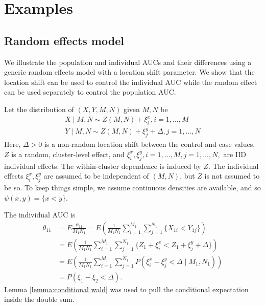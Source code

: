 \documentclass[12pt]{article}
\DeclareMathOperator{\AUC}{AUC}
\newcommand{\E}{E}
\renewcommand{\P}{P}
\newcommand{\cind}{\perp \!\!\! \perp}
\newcommand{\aucindiv}{\theta_{11}}%
\newcommand{\kernel}{\psi}
\newcommand{\Kernel}{\psi}
\begin{document}
\section{Examples}\label{section:examples} 

\subsection{Random effects model}\label{section:examples:random effects}
We illustrate the population and individual AUCs
and their differences using a generic random effects model with a
location shift parameter. We show that the location shift can be
used to control the individual AUC while the random effect can be used separately
to control the population AUC.

Let the distribution of $(X,Y,M,N)$ given $M,N$ be
\begin{align}
  X \mid M,N \sim Z(M,N) + \xi_i^x, i=1,\ldots,M\\
  Y \mid M,N \sim Z(M,N) + \xi_j^y + \Delta, j=1,\ldots,N
  \label{model:random effects}
\end{align}
Here, $\Delta>0$ is a non-random location shift between the control and
case values, $Z$ is a random, cluster-level effect, and
$\xi_i^x, \xi_j^y,i=1,\ldots,M,j=1,\ldots,N,$ are IID
individual effects. The within-cluster dependence is induced by
$Z$. The individual effects $\xi_i^x, \xi_j^y$ are assumed to be
independent of $(M,N)$, but $Z$ is not assumed to be so. To keep
things simple, we assume continuous densities are available, and so
$\kernel(x,y)=\{x<y\}$.%

The individual AUC is
\begin{align}
  \aucindiv &= \E\frac{\Kernel_{11}}{M_1N_1} 
          = \E \left(\frac{1}{M_1N_1} \sum_{i=1}^{M_1}\sum_{j=1}^{N_1}\{X_{1i}<Y_{1j}\}\right)\\
          &= \E\left( \frac{1}{M_1N_1} \sum_{i=1}^{M_1}\sum_{j=1}^{N_1}\{Z_1+\xi^x_i<Z_1+\xi_j^y+\Delta\}\right)\\
          &= \E \left(\frac{1}{M_1N_1} \sum_{i=1}^{M_1}\sum_{j=1}^{N_1}
            \P(\xi_i^x-\xi_j^y<\Delta\mid M_1,N_1)\right)\\
          &=\P(\xi_1 - \xi_2 < \Delta).\label{eqn:examples:aucindiv}
\end{align}
Lemma \ref{lemma:conditional wald} was used to pull the conditional expectation inside
the double sum.
\end{document}
